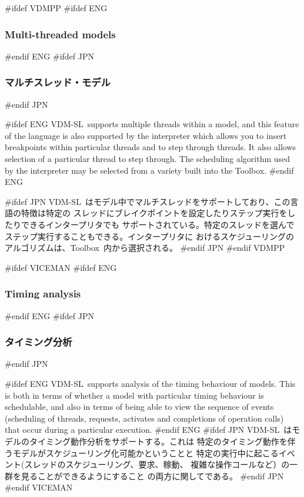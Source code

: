 \documentclass[\pformat,12pt]{article}
\newcommand{\vdmslpp}{VDM-SL}
\newcommand{\Toolbox}{Toolbox}
\newcommand{\vdmslpp}{VDM++}
\newcommand{\Toolbox}{Toolbox}
\begin{document}
#ifdef VDMPP
#ifdef ENG
\subsubsection{Multi-threaded models}
#endif ENG
#ifdef JPN
\subsubsection{マルチスレッド・モデル}
#endif JPN

#ifdef ENG
\vdmslpp\ supports multiple threads within a model, and this feature of the
language is also supported by the interpreter which allows you to
insert breakpoints within particular threads and to step
through threads. It also allows selection of a particular thread to
step through. The scheduling algorithm used by the interpreter may be
selected from a variety built into the \Toolbox.
#endif ENG

#ifdef JPN
\vdmslpp\ はモデル中でマルチスレッドをサポートしており、この言語の特徴は特定の
スレッドにブレイクポイントを設定したりステップ実行をしたりできるインタープリタでも
サポートされている。特定のスレッドを選んでステップ実行することもできる。インタープリタに
おけるスケジューリングのアルゴリズムは、\Toolbox\ 内から選択される。
#endif JPN
#endif VDMPP

#ifdef VICEMAN
#ifdef ENG
\subsubsection{Timing analysis}
#endif ENG
#ifdef JPN
\subsubsection{タイミング分析}
#endif JPN

#ifdef ENG
\vdmslpp\ supports analysis of the timing behaviour of models. This is
both in terms of whether a model with particular timing behaviour is
schedulable, and also in terms of being able to view the sequence of
events (scheduling of threads, requests, activates and completions of
operation calls) that occur during a particular execution.
#endif ENG
#ifdef JPN
\vdmslpp\ はモデルのタイミング動作分析をサポートする。これは
特定のタイミング動作を伴うモデルがスケジューリング化可能かということと
特定の実行中に起こるイベント(スレッドのスケジューリング、要求、稼動、
複雑な操作コールなど）の一群を見ることができるようにすること
の両方に関してである。
#endif JPN
#endif VICEMAN
\end{document}

